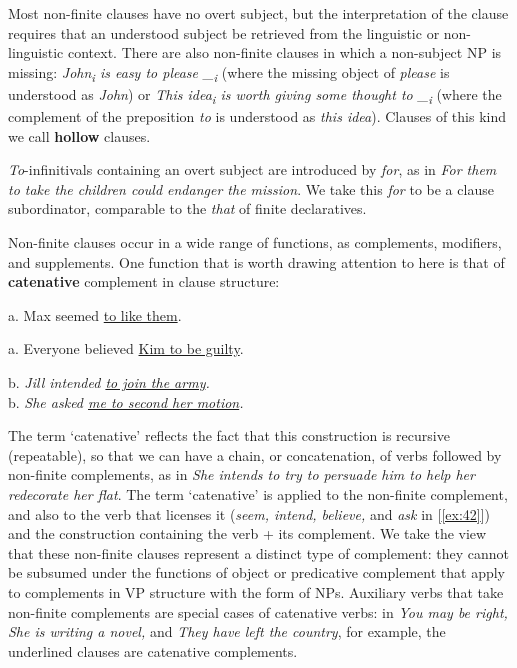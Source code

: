 Most non-finite clauses have no overt subject, but the interpretation of the clause requires that an understood subject be retrieved from the linguistic or non-linguistic context. There are also non-finite clauses in which a non-subject NP is missing: \textit{John\textsubscript{i} is easy \ob to please \_\textsubscript{i}\cb} (where the missing object of \textit{please} is understood as \textit{John}) or \textit{This idea\textsubscript{i} is worth \ob giving some thought to \_\textsubscript{i}\cb} (where the complement of the preposition \textit{to} is understood as \textit{this idea}). Clauses of this kind we call \textbf{hollow} clauses.

\textit{To}-infinitivals containing an overt subject are introduced by \textit{for}, as in \ob\textit{For them to take the children could endanger the mission}\cb. We take this \textit{for} to be a clause subordinator, comparable to the \textit{that} of finite declaratives.

Non-finite clauses occur in a wide range of functions, as complements, modifiers, and supplements. One function that is worth drawing attention to here is that of \textbf{catenative} complement in clause structure:
\begin{examples}
\item \label{ex:42}
\noindent\begin{minipage}[t]{0.5\linewidth}\vspace{-6pt}
    \begin{examples}
        \item \label{ex:42i}\textnormal{a.} Max seemed \uline{to like them}.
        \item  \label{ex:42ii}\textnormal{a.} Everyone believed \uline{Kim to be guilty}.
    \end{examples}
\end{minipage}\vspace{-\medskipamount}%
\begin{minipage}[t]{0.5\linewidth}
    b. \textit{Jill intended \uline{to join the army}.}\\
    b. \textit{She asked \uline{me to second her motion}.}
\end{minipage}
\end{examples}
The term `catenative' reflects the fact that this construction is recursive (repeatable), so that we can have a chain, or concatenation, of verbs followed by non-finite complements, as in \textit{She intends to try to persuade him to help her redecorate her flat}. The term `catenative' is applied to the non-finite complement, and also to the verb that licenses it (\textit{seem, intend, believe,} and \textit{ask} in [\ref{ex:42}]) and the construction containing the verb + its complement. We take the view that these non-finite clauses represent a distinct type of complement: they cannot be subsumed under the functions of object or predicative complement that apply to complements in VP structure with the form of NPs. Auxiliary verbs that take non-finite complements are special cases of catenative verbs: in \textit{You may be right, She is writing a novel,} and \textit{They have left the country}, for example, the underlined clauses are catenative complements.

